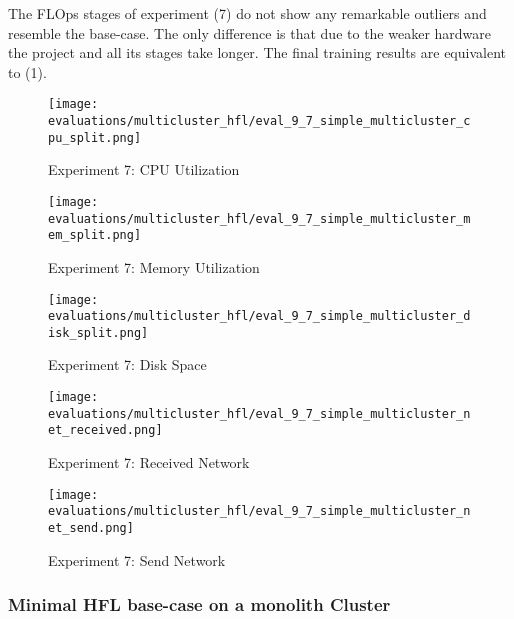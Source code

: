 The FLOps stages of experiment (7) do not show any remarkable outliers and resemble the base-case.
The only difference is that due to the weaker hardware the project and all its stages take longer.
The final training results are equivalent to (1).

\begin{figure}[H]
    \begin{adjustwidth}{-0.2\paperwidth}{-0.2\paperwidth}
        \centering
        \texttt{[image: evaluations/multicluster\_hfl/eval\_9\_7\_simple\_multicluster\_cpu\_split.png]}
        \caption{Experiment 7: CPU Utilization}
        \label{fig:eval_7_cpu}
    \end{adjustwidth}
\end{figure}

\begin{figure}[H]
    \begin{adjustwidth}{-0.2\paperwidth}{-0.2\paperwidth}
        \centering
        \texttt{[image: evaluations/multicluster\_hfl/eval\_9\_7\_simple\_multicluster\_mem\_split.png]}
        \caption{Experiment 7: Memory Utilization}
        \label{fig:eval_7_mem}
    \end{adjustwidth}
\end{figure}

\begin{figure}[H]
    \begin{adjustwidth}{-0.2\paperwidth}{-0.2\paperwidth}
        \centering
        \texttt{[image: evaluations/multicluster\_hfl/eval\_9\_7\_simple\_multicluster\_disk\_split.png]}
        \caption{Experiment 7: Disk Space}
        \label{fig:eval_7_disk_space}
    \end{adjustwidth}
\end{figure}

\begin{figure}[H]
    \begin{adjustwidth}{-0.2\paperwidth}{-0.2\paperwidth}
        \centering
        \texttt{[image: evaluations/multicluster\_hfl/eval\_9\_7\_simple\_multicluster\_net\_received.png]}
        \caption{Experiment 7: Received Network}
        \label{fig:eval_7_net_received}
    \end{adjustwidth}
\end{figure}

\begin{figure}[H]
    \begin{adjustwidth}{-0.2\paperwidth}{-0.2\paperwidth}
        \centering
        \texttt{[image: evaluations/multicluster\_hfl/eval\_9\_7\_simple\_multicluster\_net\_send.png]}
        \caption{Experiment 7: Send Network}
        \label{fig:eval_7_net_send}
    \end{adjustwidth}
\end{figure}

\subsubsection{Minimal HFL base-case on a monolith Cluster}